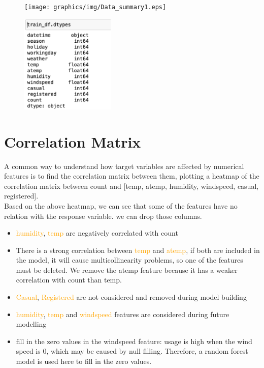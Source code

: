 \begin{figure}
  \centering
  \centerline{\texttt{[image: graphics/img/Data\_summary1.eps]}}
\end{figure}
\begin{figure}
  \centerline{\includegraphics[width=0.4\textwidth,height=0.5\textwidth]{graphics/img/Data_summary2.eps}}
\end{figure}

\section{Correlation Matrix} \label{heatmap}
A common way to understand how target variables are affected by numerical features is to find the correlation matrix between them, plotting a heatmap of the correlation matrix between count and [temp, atemp, humidity, windspeed, casual, registered].\\
Based on the above heatmap, we can see that some of the features have no relation with the response variable. we can drop those columns.
\begin{itemize}
\item
\textcolor{orange} {humidity}, \textcolor{orange}{temp} are negatively correlated with count
\item
There is a strong correlation between \textcolor{orange} {temp} and \textcolor{orange} {atemp}, if both are included in the model, it will cause multicollinearity problems, so one of the features must be deleted. We remove the atemp feature because it has a weaker correlation with count than temp.
\item
\textcolor{orange} {Casual}, \textcolor{orange}{Registered} are not considered and removed during model building 
\item
\textcolor{orange} {humidity}, \textcolor{orange}{temp} and \textcolor{orange} {windspeed} features are considered during future modelling
\item 
fill in the zero values in the windspeed feature: usage is high when the wind speed is 0, which may be caused by null filling. Therefore, a random forest model is used here to fill in the zero values. 
\end{itemize}

